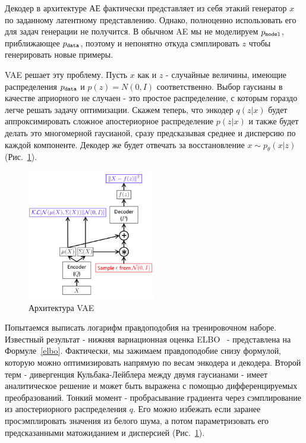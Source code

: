 \documentclass{spbau-diploma}
\begin{document}
Декодер в архитектуре АЕ фактически представляет из себя этакий генератор $x$
по заданному латентному представлению. Однако, полноценно использовать его для
задач генерации не получится. В обычном AE мы не моделируем $p_{\texttt{model}}$, 
приближающее $p_{\texttt{data}}$, поэтому и непонятно откуда сэмплировать $z$ чтобы 
генерировать новые примеры. 

VAE решает эту проблему. Пусть $x$ как и $z$ - случайные величины, имеющие
распределения $p_{\texttt{data}}$ и $p(z) = N(0, I)$ соответственно. Выбор гаусианы в 
качестве априорного не случаен - это простое распределение, с которым гораздо 
легче решать задачу оптимизации. 
Скажем теперь, что энкодер $q(z|x)$ будет аппроксимировать сложное 
апостериорное распределение $p(z|x)$ и также будет делать это многомерной
гаусианой, сразу предсказывая среднее и дисперсию по каждой компоненте. Декодер
же будет отвечать за восстановление $x \sim p_{\theta}(x|z)$ 
(Рис.~\ref{vae_terms}). 

\begin{figure}[H]
\centering
\includegraphics[width=0.5\textwidth]{images/vae_terms.png}
\caption{Архитектура VAE~\cite{habr:vae}}
\label{vae_terms}
\end{figure}

Попытаемся выписать логарифм правдоподобия на тренировочном наборе. Известный 
результат - нижняя вариационная оценка ELBO~\cite{vae} - представлена на 
Формуле~\ref{elbo}. Фактически, мы зажимаем правдоподобие снизу формулой, 
которую можно оптимизировать напрямую по весам энкодера и декодера. 
Второй терм - дивергенция Кульбака-Лейблера между двумя гаусианами - имеет 
аналитическое решение и может быть выражена с помощью дифференцируемых 
преобразований. 
Тонкий момент - пробрасывание градиента через сэмплирование из апостериорного 
распределения $q$. Его можно избежать если заранее просэмплировать значения из
белого шума, а потом параметризовать его предсказанными матожиданием и 
дисперсией (Рис.~\ref{vae_terms}).
\end{document}
